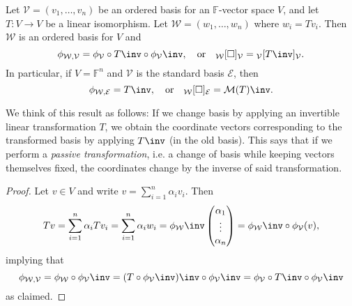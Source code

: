 \documentclass[a4paper, 11pt]{memoir}
\numberwithin{equation}{chapter}
\newcommand{\calV}{\mathcal{V}}
\newcommand{\calW}{\mathcal{W}}
\newcommand{\calE}{\mathcal{E}}
\newcommand{\field}{\mathbb{F}}
\newcommand{\newpar}{\paragraph{}}
\begin{document}
\begin{proposition}
    Let $\calV = (v_1, \ldots, v_n)$ be an ordered basis for an $\field$-vector space $V$, and let $T \colon V \to V$ be a linear isomorphism. Let $\calW = (w_1, \ldots, w_n)$ where $w_i = Tv_i$. Then $\calW$ is an ordered basis for $V$ and
    \begin{equation*}
        \basischange{\calW}{\calV}
            = \coordmap{\calV} \circ T\inv \circ \coordmap{\calV}\inv,
        \quad \text{or} \quad
        \basischangemat{\calW}{\calV}
            = \mr{\calV}{T\inv}{\calV}.
    \end{equation*}
    In particular, if $V = \field^n$ and $\calV$ is the standard basis $\calE$, then
    \begin{equation*}
        \basischange{\calW}{\calE}
            = T\inv,
        \quad \text{or} \quad
        \basischangemat{\calW}{\calE}
            = \smr{T}\inv.
    \end{equation*}
\end{proposition}
%
We think of this result as follows: If we change basis by applying an invertible linear transformation $T$, we obtain the coordinate vectors corresponding to the transformed basis by applying $T\inv$ (in the old basis). This says that if we perform a \emph{passive transformation}, i.e. a change of basis while keeping vectors themselves fixed, the coordinates change by the inverse of said transformation.

\begin{proof}
    Let $v \in V$ and write $v = \sum_{i=1}^n \alpha_i v_i$. Then
    \begin{equation*}
        Tv
            = \sum_{i=1}^n \alpha_i Tv_i
            = \sum_{i=1}^n \alpha_i w_i
            = \coordmap{\calW}\inv \colvec{\alpha_1 \\ \vdots \\ \alpha_n}
            = \coordmap{\calW}\inv \circ \coordmap{\calV}(v),
    \end{equation*}
    implying that
    \begin{equation*}
        \basischange{\calW}{\calV}
            = \coordmap{\calW} \circ \coordmap{\calV}\inv
            = (T \circ \coordmap{\calV}\inv)\inv \circ \coordmap{\calV}\inv
            = \coordmap{\calV} \circ T\inv \circ \coordmap{\calV}\inv
    \end{equation*}
    as claimed.
\end{proof}


\newpar
\end{document}
